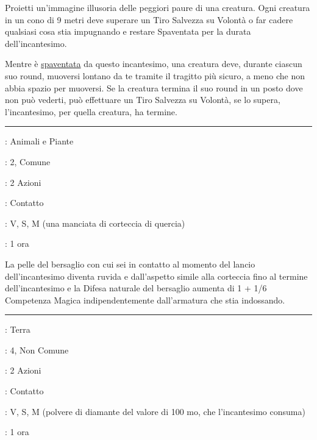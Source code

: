 \begin{multicols}{2}
Proietti un'immagine illusoria delle peggiori paure di una creatura. Ogni creatura in un cono di 9 metri deve superare un Tiro Salvezza su Volontà o far cadere qualsiasi cosa stia impugnando e restare Spaventata per la durata dell'incantesimo.

Mentre è \hyperlink{condizionepaura}{spaventata} da questo incantesimo, una creatura deve, durante ciascun suo round, muoversi lontano da te tramite il tragitto più sicuro, a meno che non abbia spazio per muoversi. Se la creatura termina il suo round in un posto dove non può vederti, può effettuare un Tiro Salvezza su Volontà, se lo supera, l'incantesimo, per quella creatura, ha termine.

\smallskip\noindent\rule{\linewidth}{2pt} \hypertarget{Pelle di Corteccia}{}\medskip{}
\noindent
\begin{description}[noitemsep, topsep=0pt, parsep=0pt, partopsep=0pt, leftmargin=0cm, labelwidth=2.8cm]
	\item[\textbf{Lista di Magia}]: Animali e Piante
	\item[\textbf{Livello}]: 2, Comune
	\item[\textbf{T. di Lancio}]: 2 Azioni
	\item[\textbf{Gittata}]: Contatto
	\item[\textbf{Componenti}]: V, S, M (una manciata di corteccia di quercia)
	\item[\textbf{Durata}]: 1 ora
\end{description}

La pelle del bersaglio con cui sei in contatto al momento del lancio dell'incantesimo diventa ruvida e dall'aspetto simile alla corteccia fino al termine dell'incantesimo e la Difesa naturale del bersaglio aumenta di 1 + 1/6 Competenza Magica indipendentemente dall'armatura che stia indossando.

\smallskip\noindent\rule{\linewidth}{2pt} \hypertarget{Pelle di Pietra}{}\medskip{}
\noindent
\begin{description}[noitemsep, topsep=0pt, parsep=0pt, partopsep=0pt, leftmargin=0cm, labelwidth=2.8cm]
	\item[\textbf{Lista di Magia}]: Terra
	\item[\textbf{Livello}]: 4, Non Comune
	\item[\textbf{T. di Lancio}]: 2 Azioni
	\item[\textbf{Gittata}]: Contatto
	\item[\textbf{Componenti}]: V, S, M (polvere di diamante del valore di 100 mo, che l'incantesimo consuma)
	\item[\textbf{Durata}]: 1 ora
\end{description}


\end{multicols}
